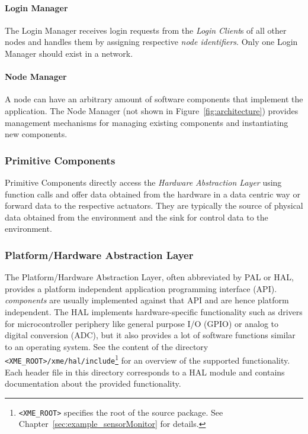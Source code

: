 \paragraph{Login Manager}
The Login Manager receives login requests from the \emph{Login Client}s of all other nodes and handles them by assigning respective \emph{node identifiers}.
Only one Login Manager should exist in a network.

\paragraph{Node Manager}
A node can have an arbitrary amount of software components that implement the application.
The Node Manager (not shown in Figure~\ref{fig:architecture}) provides management mechanisms for managing existing components and instantiating new components.



\subsubsection{Primitive Components}

Primitive Components directly access the \emph{Hardware Abstraction Layer} using function calls
and offer data obtained from the hardware in a data centric way or forward data to the respective actuators.
They are typically the source of physical data obtained from the environment and
the sink for control data to the environment.



\subsubsection{Platform/Hardware Abstraction Layer}

The Platform/Hardware Abstraction Layer, often abbreviated by PAL or HAL,
provides a platform independent application programming interface (API).
\xme \emph{components} are usually implemented against that API and are hence platform independent.
The HAL implements hardware-specific functionality such as drivers for microcontroller periphery
like general purpose I/O (GPIO) or analog to digital conversion (ADC),
but it also provides a lot of software functions similar to an operating system.
See the content of the directory \verb|<XME_ROOT>/xme/hal/include|\footnote{%
	\texttt{<XME\_ROOT>} specifies the root of the \xme source package.
	See Chapter~\ref{sec:example_sensorMonitor} for details.
}
for an overview of the supported functionality.
Each header file in this directory corresponds to a HAL module
and contains documentation about the provided functionality.

